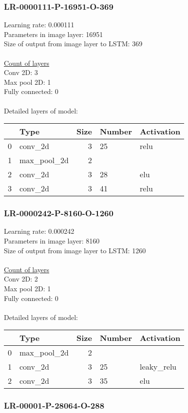 \subsubsection*{LR-0000111-P-16951-O-369}
Learning rate: 0.000111
\\Parameters in image layer: 16951
\\Size of output from image layer to LSTM: 369
\\\\\underline{Count of layers} 
\\Conv 2D:           3\\Max pool 2D:      1\\Fully connected:  0
\\\\Detailed layers of model: \\\begin{tabular}{rlrll}
\hline
    & Type        &   Size & Number   & Activation   \\
\hline
  0 & conv\_2d     &      3 & 25       & relu         \\
  1 & max\_pool\_2d &      2 &          &              \\
  2 & conv\_2d     &      3 & 28       & elu          \\
  3 & conv\_2d     &      3 & 41       & relu         \\
\hline
\end{tabular}\subsubsection*{LR-0000242-P-8160-O-1260}
Learning rate: 0.000242
\\Parameters in image layer: 8160
\\Size of output from image layer to LSTM: 1260
\\\\\underline{Count of layers} 
\\Conv 2D:           2\\Max pool 2D:      1\\Fully connected:  0
\\\\Detailed layers of model: \\\begin{tabular}{rlrll}
\hline
    & Type        &   Size & Number   & Activation   \\
\hline
  0 & max\_pool\_2d &      2 &          &              \\
  1 & conv\_2d     &      3 & 25       & leaky\_relu   \\
  2 & conv\_2d     &      3 & 35       & elu          \\
\hline
\end{tabular}\subsubsection*{LR-00001-P-28064-O-288}

